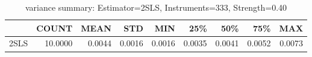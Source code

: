 \begin{table}[ht]
\centering
\caption{variance summary: Estimator=2SLS, Instruments=333, Strength=0.40}
\begin{tabular}{lrrrrrrrr}
\toprule
 & COUNT & MEAN & STD & MIN & 25\% & 50\% & 75\% & MAX \\
\midrule
2SLS & 10.0000 & 0.0044 & 0.0016 & 0.0016 & 0.0035 & 0.0041 & 0.0052 & 0.0073 \\
\bottomrule
\end{tabular}
\end{table}
